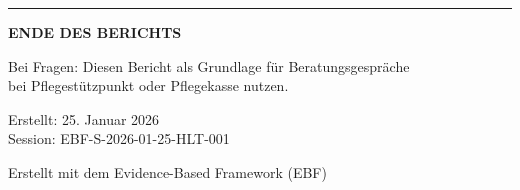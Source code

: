 \documentclass[11pt,a4paper]{article}
\begin{document}
\vfill
\begin{center}
\rule{0.8\textwidth}{0.4pt}

\vspace{0.5cm}
\textbf{ENDE DES BERICHTS}

\vspace{0.3cm}
Bei Fragen: Diesen Bericht als Grundlage für Beratungsgespräche\\
bei Pflegestützpunkt oder Pflegekasse nutzen.

\vspace{0.5cm}
Erstellt: 25. Januar 2026\\
Session: EBF-S-2026-01-25-HLT-001

\vspace{0.3cm}
{\small Erstellt mit dem Evidence-Based Framework (EBF)}
\end{center}
\end{document}
